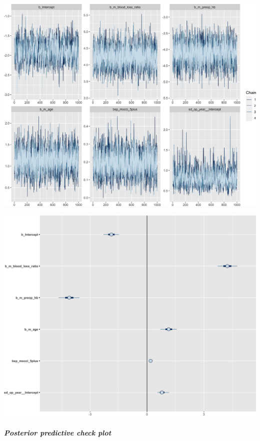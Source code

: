 \documentclass[
]{article}
\begin{document}
\begin{center}\includegraphics[width=1\linewidth]{notebook_files/figure-latex/model1reduced_diagnostics-1} \end{center}

\begin{center}\includegraphics[width=1\linewidth]{notebook_files/figure-latex/model1reduced_diagnostics-2} \end{center}

\hypertarget{posterior-predictive-check-plot-1}{%
\subparagraph{Posterior predictive check plot}\label{posterior-predictive-check-plot-1}}
\end{document}

